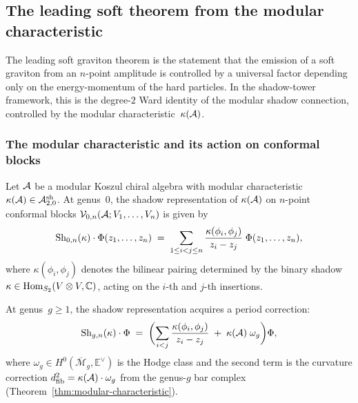 %
%

\subsection{The leading soft theorem from the modular characteristic}
\label{subsec:thqg-VI-leading-soft}

The leading soft graviton theorem is the statement that the
emission of a soft graviton from an $n$-point amplitude is
controlled by a universal factor depending only on the
energy-momentum of the hard particles. In the shadow-tower
framework, this is the degree-$2$ Ward identity of the modular
shadow connection, controlled by the modular
characteristic~$\kappa(\mathcal{A})$.

\subsubsection{The modular characteristic and its action on
conformal blocks}

\begin{proposition}
\label{prop:thqg-VI-kappa-action}
Let $\mathcal{A}$ be a modular Koszul chiral algebra with modular
characteristic $\kappa(\mathcal{A}) \in \mathcal{A}^{\mathrm{sh}}_{2,0}$.
At genus~$0$, the shadow representation of $\kappa(\mathcal{A})$ on
$n$-point conformal blocks $\mathcal{V}_{0,n}(\mathcal{A}; V_1, \dotsc, V_n)$
is given by
\begin{equation}\label{eq:thqg-VI-kappa-genus0}
\operatorname{Sh}_{0,n}(\kappa) \cdot \Phi(z_1, \dotsc, z_n)
\;=\;
\sum_{1 \leq i < j \leq n}
\frac{\kappa(\phi_i, \phi_j)}{z_i - z_j}\;
\Phi(z_1, \dotsc, z_n),
\end{equation}
where $\kappa(\phi_i, \phi_j)$ denotes the bilinear pairing
determined by the binary shadow $\kappa \in \operatorname{Hom}_{S_2}(V \otimes V, \mathbb{C})$,
acting on the $i$-th and $j$-th insertions.

At genus~$g \geq 1$, the shadow representation acquires a period
correction:
\begin{equation}\label{eq:thqg-VI-kappa-genus-g}
\operatorname{Sh}_{g,n}(\kappa) \cdot \Phi
\;=\;
\biggl(\sum_{i < j}
\frac{\kappa(\phi_i, \phi_j)}{z_i - z_j}
\;+\;
\kappa(\mathcal{A})\;\omega_g\biggr)\Phi,
\end{equation}
where $\omega_g \in H^0(\overline{\mathcal{M}}_g, \mathbb{E}^\vee)$
is the Hodge class and the second term is the curvature correction
$d_{\mathrm{fib}}^2 = \kappa(\mathcal{A}) \cdot \omega_g$ from the genus-$g$ bar
complex (Theorem~\ref{thm:modular-characteristic}).
\end{proposition}


